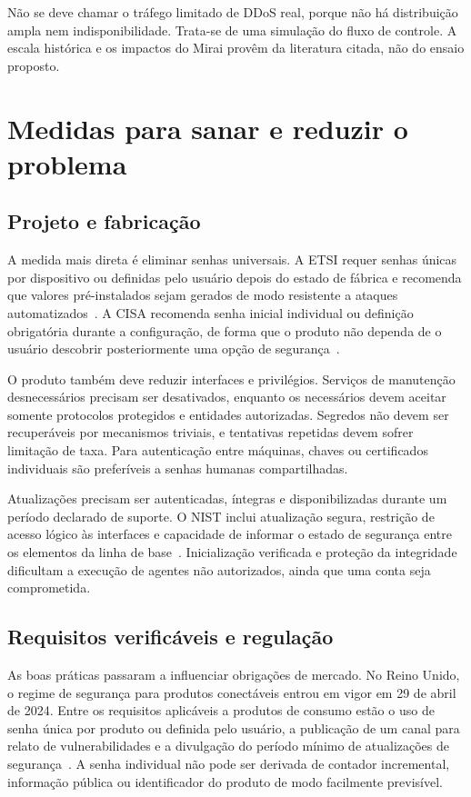 \documentclass[11pt,a4paper]{article}
\begin{document}
Não se deve chamar o tráfego limitado de DDoS real, porque não há distribuição ampla nem indisponibilidade. Trata-se de uma simulação do fluxo de controle. A escala histórica e os impactos do Mirai provêm da literatura citada, não do ensaio proposto.

\section{Medidas para sanar e reduzir o problema}
\subsection{Projeto e fabricação}
A medida mais direta é eliminar senhas universais. A ETSI requer senhas únicas por dispositivo ou definidas pelo usuário depois do estado de fábrica e recomenda que valores pré-instalados sejam gerados de modo resistente a ataques automatizados~\cite{etsi303645}. A CISA recomenda senha inicial individual ou definição obrigatória durante a configuração, de forma que o produto não dependa de o usuário descobrir posteriormente uma opção de segurança~\cite{cisa2023passwords}.

O produto também deve reduzir interfaces e privilégios. Serviços de manutenção desnecessários precisam ser desativados, enquanto os necessários devem aceitar somente protocolos protegidos e entidades autorizadas. Segredos não devem ser recuperáveis por mecanismos triviais, e tentativas repetidas devem sofrer limitação de taxa. Para autenticação entre máquinas, chaves ou certificados individuais são preferíveis a senhas humanas compartilhadas.

Atualizações precisam ser autenticadas, íntegras e disponibilizadas durante um período declarado de suporte. O NIST inclui atualização segura, restrição de acesso lógico às interfaces e capacidade de informar o estado de segurança entre os elementos da linha de base~\cite{nist8259a}. Inicialização verificada e proteção da integridade dificultam a execução de agentes não autorizados, ainda que uma conta seja comprometida.

\subsection{Requisitos verificáveis e regulação}
As boas práticas passaram a influenciar obrigações de mercado. No Reino Unido, o regime de segurança para produtos conectáveis entrou em vigor em 29 de abril de 2024. Entre os requisitos aplicáveis a produtos de consumo estão o uso de senha única por produto ou definida pelo usuário, a publicação de um canal para relato de vulnerabilidades e a divulgação do período mínimo de atualizações de segurança~\cite{ukpsti2023}. A senha individual não pode ser derivada de contador incremental, informação pública ou identificador do produto de modo facilmente previsível.
\end{document}
